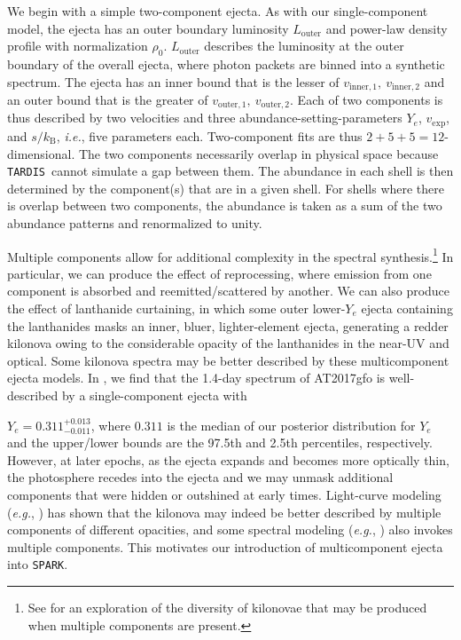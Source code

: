 \documentclass[twocolumn,twocolappendix]{aastex63}
\def\SPARK{\texttt{SPARK}}
\def\TARDIS{\texttt{TARDIS}}
\def\V23{\citetalias{vieira23}}
\def\eg{{\it e.g.}}
\def\ie{{\it i.e.}}
\begin{document}
{We begin with a simple two-component ejecta. As with our single-component model, the ejecta has an outer boundary luminosity $L_{\mathrm{outer}}$ and power-law density profile with normalization $\rho_0$. $L_{\mathrm{outer}}$ describes the luminosity at the outer boundary of the overall ejecta, where photon packets are binned into a synthetic spectrum. The ejecta has an inner bound that is the lesser of $v_{\mathrm{inner},1},~v_{\mathrm{inner},2}$ and an outer bound that is the greater of $v_{\mathrm{outer},1},~v_{\mathrm{outer},2}$. Each of two components is thus described by two velocities and three abundance-setting-parameters $Y_e$, $v_{\mathrm{exp}}$, and $s / k_{\mathrm{B}}$, \ie, five parameters each. Two-component fits are thus $2 + 5 + 5 = 12$-dimensional. The two components necessarily overlap in physical space because \TARDIS~cannot simulate a gap between them. The abundance in each shell is then determined by the component(s) that are in a given shell. For shells where there is overlap between two components, the abundance is taken as a sum of the two abundance patterns and renormalized to unity. 

Multiple components allow for additional complexity in the spectral synthesis.\footnote{See \cite{kawaguchi20} for an exploration of the diversity of kilonovae that may be produced when multiple components are present.} In particular, we can produce the effect of reprocessing, where emission from one component is absorbed and reemitted/scattered by another. We can also produce the effect of lanthanide curtaining, in which some outer lower-$Y_e$ ejecta containing the lanthanides masks an inner, bluer, lighter-element ejecta, generating a redder kilonova owing to the considerable opacity of the lanthanides in the near-UV and optical. Some kilonova spectra may be better described by these multicomponent ejecta models. In \V23, we find that the 1.4-day spectrum of AT2017gfo is well-described by a single-component ejecta with {$Y_e = 0.311^{+0.013}_{-0.011}$, where $0.311$ is the median of our posterior distribution for $Y_e$ and the upper/lower bounds are the 97.5th and 2.5th percentiles, respectively. However, at later epochs, as the ejecta expands and becomes more optically thin, the photosphere recedes into the ejecta and we may unmask additional components that were hidden or outshined at early times. Light-curve modeling (\eg, \citealt{villar17}) has shown that the kilonova may indeed be better described by multiple components of different opacities, and some spectral modeling (\eg, \citealt{kasen17}) also invokes multiple components. This motivates our introduction of multicomponent ejecta into \SPARK.




}}
\end{document}
